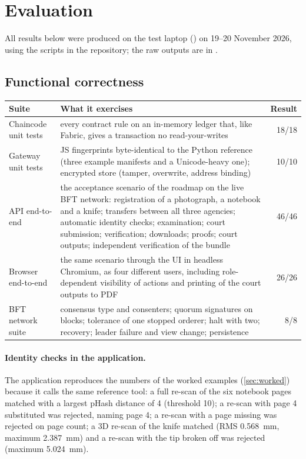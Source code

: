 \section{Evaluation}
\label{sec:eval}

All results below were produced on the test laptop () on 19--20 November 2026, using the scripts in the repository; the raw outputs are in .

\subsection{Functional correctness}
\begin{center}\small
\begin{tabularx}{\linewidth}{@{}lXr@{}}
\toprule
Suite & What it exercises & Result \\
\midrule
Chaincode unit tests & every contract rule on an in-memory ledger that, like Fabric, gives a transaction no read-your-writes & 18/18 \\
Gateway unit tests & JS fingerprints byte-identical to the Python reference (three example manifests and a Unicode-heavy one); encrypted store (tamper, overwrite, address binding) & 10/10 \\
API end-to-end & the acceptance scenario of the roadmap on the live BFT network: registration of a photograph, a notebook and a knife; transfers between all three agencies; automatic identity checks; examination; court submission; verification; downloads; proofs; court outputs; independent verification of the bundle & 46/46 \\
Browser end-to-end & the same scenario through the UI in headless Chromium, as four different users, including role-dependent visibility of actions and printing of the court outputs to PDF & 26/26 \\
BFT network suite & consensus type and consenters; quorum signatures on blocks; tolerance of one stopped orderer; halt with two; recovery; leader failure and view change; persistence & 8/8 \\
\bottomrule
\end{tabularx}
\end{center}

\paragraph{Identity checks in the application.} The application reproduces the numbers of the worked examples (\cref{sec:worked}) because it calls the same reference tool: a full re-scan of the six notebook pages matched with a largest pHash distance of 4 (threshold 10); a re-scan with page 4 substituted was rejected, naming page 4; a re-scan with a page missing was rejected on page count; a 3D re-scan of the knife matched (RMS 0.568~mm, maximum 2.387~mm) and a re-scan with the tip broken off was rejected (maximum 5.024~mm).

